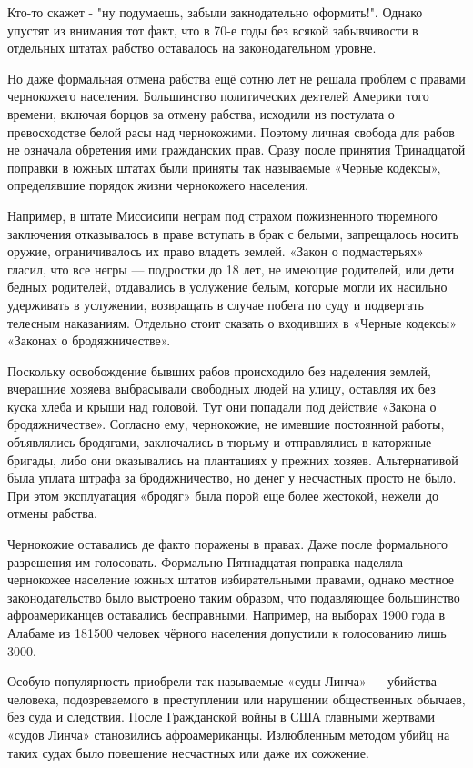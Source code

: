 Кто-то скажет - "ну подумаешь, забыли закнодательно оформить!". Однако упустят
из внимания тот факт, что в 70-е годы без всякой забывчивости в отдельных
штатах рабство оставалось на законодательном уровне.


Но даже формальная отмена рабства ещё сотню лет не решала проблем с правами
чернокожего населения. Большинство политических деятелей Америки того времени,
включая борцов за отмену рабства, исходили из постулата о превосходстве белой
расы над чернокожими. Поэтому личная свобода для рабов не означала обретения
ими гражданских прав. Сразу после принятия Тринадцатой поправки в южных штатах
были приняты так называемые «Черные кодексы», определявшие порядок жизни
чернокожего населения.

Например, в штате Миссисипи неграм под страхом пожизненного тюремного
заключения отказывалось в праве вступать в брак с белыми, запрещалось носить
оружие, ограничивалось их право владеть землей. «Закон о подмастерьях» гласил,
что все негры --- подростки до 18 лет, не имеющие родителей, или дети бедных
родителей, отдавались в услужение белым, которые могли их насильно удерживать в
услужении, возвращать в случае побега по суду и подвергать телесным наказаниям.
Отдельно стоит сказать о входивших в «Черные кодексы» «Законах о
бродяжничестве».

Поскольку освобождение бывших рабов происходило без наделения землей, вчерашние
хозяева выбрасывали свободных людей на улицу, оставляя их без куска хлеба и
крыши над головой. Тут они попадали под действие «Закона о бродяжничестве».
Согласно ему, чернокожие, не имевшие постоянной работы, объявлялись бродягами,
заключались в тюрьму и отправлялись в каторжные бригады, либо они оказывались
на плантациях у прежних хозяев. Альтернативой была уплата штрафа за
бродяжничество, но денег у несчастных просто не было. При этом эксплуатация
«бродяг» была порой еще более жестокой, нежели до отмены рабства.

Чернокожие оставались де факто поражены в правах. Даже после формального
разрешения им голосовать. Формально Пятнадцатая поправка наделяла чернокожее
население южных штатов избирательными правами, однако местное законодательство
было выстроено таким образом, что подавляющее большинство афроамериканцев
оставались бесправными. Например, на выборах 1900 года в Алабаме из 181500
человек чёрного населения допустили к голосованию лишь 3000.

Особую популярность приобрели так называемые «суды Линча» --- убийства человека,
подозреваемого в преступлении или нарушении общественных обычаев, без суда и
следствия. После Гражданской войны в США главными жертвами «судов Линча»
становились афроамериканцы. Излюбленным методом убийц на таких судах было
повешение несчастных или даже их сожжение.

